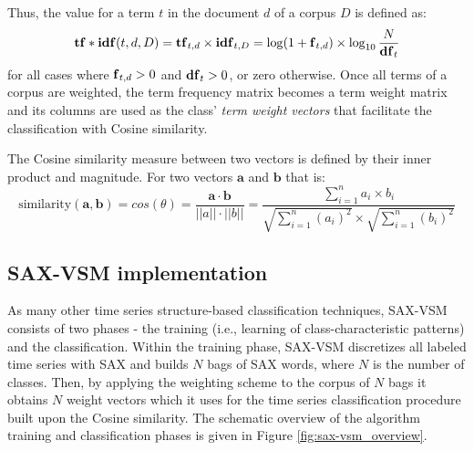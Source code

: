 Thus, the \tfidf value for a term $\textit{t}$ in the document 
$\textit{d}$ of a corpus $\textit{D}$ is defined as:
\begin{equation}
 \text{\textbf{tf}} \ast \text{\textbf{idf}}(t, d, D) =  \text{\textbf{tf}}_{t, d} \times \text{\textbf{idf}}_{t, D} = \log(1 + \text{\textbf{f}}_{t,d})
\times \log_{10}\frac{N}{\mbox{\textbf{df}}_{t}}
 \label{formula:tfidf}
\end{equation} 
for all cases where $\mbox{\textbf{f}}_{t,d}>0$ and $\mbox{\textbf{df}}_{t}>0$, or zero otherwise.
Once all terms of a corpus are weighted, the term frequency matrix becomes a term weight matrix and its columns 
are used as the class' \textit{term weight vectors} that facilitate the classification with Cosine similarity. 

The Cosine similarity measure between two vectors is defined by their inner product and magnitude. 
For two vectors $\mathbf{a}$ and $\mathbf{b}$ that is:
\begin{equation}
\mbox{similarity}(\mathbf{a},\mathbf{b}) = cos(\theta) = 
\frac{ \mathbf{a} \cdot \mathbf{b} } {\left| \left| a \right| \right| \cdot \left| \left| b \right|\right|} =
\frac{ \sum\limits_{i=1}^{n}{a_{i} \times b_{i}} }{ \sqrt{\sum\limits_{i=1}^{n}{(a_{i})^2}} \times \sqrt{\sum\limits_{i=1}^{n}{(b_{i})^2}}}
\label{eq:cosine_similarity}
\end{equation} 

\subsection{SAX-VSM implementation} \label{sax-vsm}
As many other time series structure-based classification techniques, SAX-VSM consists of two 
phases - the training (i.e., learning of class-characteristic patterns) and the classification. 
Within the training phase, SAX-VSM discretizes all labeled time series with SAX and builds $N$ bags 
of SAX words, where $N$ is the number of classes. 
Then, by applying the \tfidf weighting scheme to the corpus of $N$ bags it obtains $N$ weight vectors 
which it uses for the time series classification procedure built upon the Cosine similarity. 
The schematic overview of the algorithm training and classification phases is given in Figure \ref{fig:sax-vsm_overview}.

